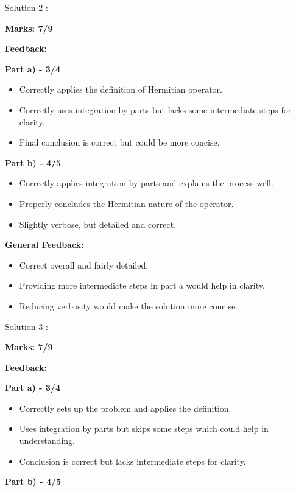 \documentclass[a4paper,11pt]{article}
\begin{document}
Solution 2 :

\textbf{Marks: 7/9}

\textbf{Feedback:}

\textbf{Part a) - 3/4}

\begin{itemize}
    \item Correctly applies the definition of Hermitian operator.
    \item Correctly uses integration by parts but lacks some intermediate steps for clarity.
    \item Final conclusion is correct but could be more concise.
\end{itemize}

\textbf{Part b) - 4/5}

\begin{itemize}
    \item Correctly applies integration by parts and explains the process well.
    \item Properly concludes the Hermitian nature of the operator.
    \item Slightly verbose, but detailed and correct.
\end{itemize}

\textbf{General Feedback:}

\begin{itemize}
    \item Correct overall and fairly detailed.
    \item Providing more intermediate steps in part a would help in clarity.
    \item Reducing verbosity would make the solution more concise.
\end{itemize}


Solution 3 :

\textbf{Marks: 7/9}

\textbf{Feedback:}

\textbf{Part a) - 3/4}

\begin{itemize}
    \item Correctly sets up the problem and applies the definition.
    \item Uses integration by parts but skips some steps which could help in understanding.
    \item Conclusion is correct but lacks intermediate steps for clarity.
\end{itemize}

\textbf{Part b) - 4/5}
\end{document}
